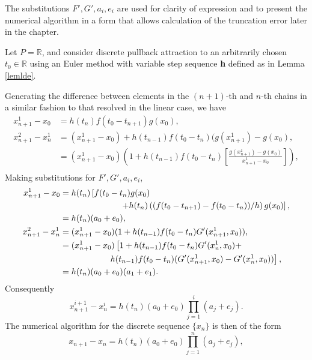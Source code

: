 \begin{prf}
The substitutions $F', G', a_i, e_i$ are used for clarity of expression and to
present the numerical algorithm in a form that allows calculation of the
truncation error later in the chapter.

Let $P = \mathbb{R}$, and consider discrete pullback attraction to an
arbitrarily chosen $t_0 \in \mathbb{R}$ using an Euler method with variable
step sequence {\bf h} defined as in Lemma \ref{lemlde}.

Generating the difference between elements in the $(n+1)$-th and $n$-th chains
in a similar fashion to that resolved in the linear case, we have
\begin{align*}
x^1_{n+1} - x_0 &= h (t_n)f(t_0 - t_{n+1}) g(x_0), \\
x^2_{n+1} - x^1_n &= (x^1_{n+1} - x_0) + h(t_{n-1})f(t_0 - t_n)(g(x_{n+1}^1) -
                         g(x_0), \\
  &= (x_{n+1}^1 - x_0) \left( 1 + h(t_{n-1})f(t_0 - t_n) \left[ \frac{g(x_{n+1}^1) -
                          g(x_0)}{x_{n+1}^1 - x_0} \right] \right), \\
\end{align*}
Making substitutions for $F', G', a_i, e_i$,
\begin{align*}
x^1_{n+1} - x_0 &= h(t_{n}) \left[ f(t_0 - t_n)g(x_0) \right. \\
   &\hspace{2.5cm} \left. + h(t_{n}) \left(
     (f(t_0-t_{n+1}) - f(t_0 - t_n))/h \right) g(x_0) \right], \\
   &= h(t_{n}) (a_0  + e_0), \\
x^2_{n+1} - x^1_n &= (x^1_{n+1} - x_0) ( 1 + h(t_{n-1}) f(t_0 - t_n) G'(x_{n+1}^1, x_0)),
                 \\
  &= (x^1_{n+1} - x_0) \left[ 1 + h(t_{n-1}) f(t_0 - t_n) G'(x_{n}^1, x_0) + \right.\\
  & \hspace{2cm} \left. h(t_{n-1}) f(t_0 -
                     t_n) ( G'(x_{n+1}^1, x_0) - G'(x_{n}^1, x_0))\right], \\
  &= h(t_{n}) (a_0 + e_0) ( a_1 + e_1). \\
\end{align*}
Consequently
\[ x^{i+1}_{n+1} - x^{i}_n = h(t_{n}) (a_0 + e_0) \prod_{j=1}^i (a_j + e_j). \]
The numerical algorithm for the discrete sequence $\{ x_n \}$ is then of the
form
\[ x_{n+1} - x_n = h(t_{n}) (a_0 + e_0) \prod_{j=1}^n (a_j + e_j), \]
\end{prf}

